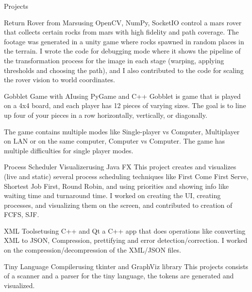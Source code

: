 \documentclass{resume}
\begin{document}
\begin{rSection}{Projects}
\begin{rSubsection}{Return Rover from Mars}{}{using OpenCV, NumPy, SocketIO}{}
control a mars rover that collects certain rocks from mars with high fidelity and path coverage. The footage was generated in a unity game where rocks spawned in random places in the terrain. I wrote the code for debugging mode where it shows the pipeline of the transformation process for the image in each stage (warping, applying thresholds and choosing the path), and I also contributed to the code for scaling the rover vision to world coordinates.
\end{rSubsection}


\begin{rSubsection}{Gobblet Game with AI}{}{using PyGame and C++}{}
Gobblet is game that is played on a 4x4 board, and each player has 12 pieces of varying sizes. The goal is to line up four of your pieces in a row horizontally, vertically, or diagonally.

The game contains multiple modes like Single-player vs Computer, Multiplayer on LAN or on the same computer, Computer vs Computer. The game has multiple difficulties for single player modes.
\end{rSubsection}



\begin{rSubsection}{Process Scheduler Visualizer}{}{using Java FX}{}
This project creates and visualizes (live and static) several process scheduling techniques like First Come First Serve, Shortest Job First, Round Robin, and using priorities and showing info like waiting time and turnaround time. I worked on creating the UI, creating processes, and visualizing them on the screen, and contributed to creation of FCFS, SJF.
\end{rSubsection}



\begin{rSubsection}{XML Toolset}{}{using C++ and Qt}{}
a C++ app that does operations like converting XML to JSON, Compression, prettifying and error detection/correction. I worked on the compression/decompression of the XML/JSON files.
\end{rSubsection}


\begin{rSubsection}{Tiny Language Compiler}{}{using tkinter and GraphViz library}{}
This projects consists of a scanner and a parser for the tiny language, the tokens are generated and visualized.
\end{rSubsection}



\end{rSection}
\end{document}
